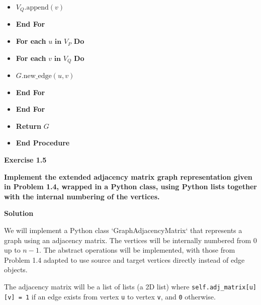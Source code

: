 \documentclass{article}
\begin{document}
\begin{itemize}
\begin{itemize}
        \item \hspace{1cm} $V_Q.\text{append}(v)$
        \item \hspace{0.5cm} \textbf{End For}
        \item \hspace{0.5cm} \textbf{For each} $u \textbf{ in } V_P$ \textbf{Do}
        \item \hspace{1cm} \textbf{For each} $v \textbf{ in } V_Q$ \textbf{Do}
        \item \hspace{1.5cm} $G.\text{new\_edge}(u, v)$
        \item \hspace{1cm} \textbf{End For}
        \item \hspace{0.5cm} \textbf{End For}
        \item \hspace{0.5cm} \textbf{Return} $G$
        \item \textbf{End Procedure}
    \end{itemize}
\end{itemize}

\textbf{Exercise 1.5}

\textbf{Implement the extended adjacency matrix graph representation given in Problem 1.4, wrapped in a Python class, using Python lists together with the internal numbering of the vertices.}

\textbf{Solution}

We will implement a Python class `GraphAdjacencyMatrix` that represents a graph using an adjacency matrix. The vertices will be internally numbered from $0$ up to $n-1$. The abstract operations will be implemented, with those from Problem 1.4 adapted to use source and target vertices directly instead of edge objects.

The adjacency matrix will be a list of lists (a 2D list) where \texttt{self.adj\_matrix[u][v] = 1} if an edge exists from vertex \texttt{u} to vertex \texttt{v}, and \texttt{0} otherwise.
\end{document}
